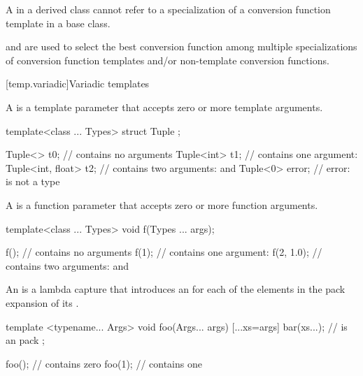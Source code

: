 \pnum
A  in a derived class cannot refer to a specialization
of a
conversion function template
in a base class.

\pnum
{} and  are used to select the best conversion function
among multiple
specializations of conversion function templates
and/or non-template
conversion functions.

[temp.variadic]{Variadic templates}

\pnum
A  is a template parameter
that accepts zero or more template arguments.
\begin{example}
\begin{codeblock}
template<class ... Types> struct Tuple { };

Tuple<> t0;                     //  contains no arguments
Tuple<int> t1;                  //  contains one argument: 
Tuple<int, float> t2;           //  contains two arguments:  and 
Tuple<0> error;                 // error:  is not a type
\end{codeblock}
\end{example}

\pnum
A  is a function parameter
that accepts zero or more function arguments.
\begin{example}
\begin{codeblock}
template<class ... Types> void f(Types ... args);

f();                            //  contains no arguments
f(1);                           //  contains one argument: 
f(2, 1.0);                      //  contains two arguments:  and 
\end{codeblock}
\end{example}

\pnum
An 
is a lambda capture that introduces an 
for each of the elements in the pack expansion of its .
\begin{example}
\begin{codeblock}
template <typename... Args>
void foo(Args... args) {
    [...xs=args]{
        bar(xs...);             //  is an  pack
    };
}

foo();                          //  contains zero 
foo(1);                         //  contains one 
\end{codeblock}
\end{example}

